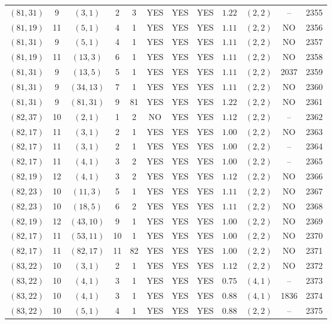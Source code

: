 \begin{longtable}{|c|c|c|c|c|c|c|c|c|c|c|c|}
$(81,31)$ & 9 & $(3,1)$ & 2 & 3 & YES & YES & YES & $1.22$ & $(2,2)$ & -- & 2355\\
$(81,19)$ & 11 & $(5,1)$ & 4 & 1 & YES & YES & YES & $1.11$ & $(2,2)$ & NO & 2356\\
$(81,31)$ & 9 & $(5,1)$ & 4 & 1 & YES & YES & YES & $1.11$ & $(2,2)$ & NO & 2357\\
$(81,19)$ & 11 & $(13,3)$ & 6 & 1 & YES & YES & YES & $1.11$ & $(2,2)$ & NO & 2358\\
$(81,31)$ & 9 & $(13,5)$ & 5 & 1 & YES & YES & YES & $1.11$ & $(2,2)$ & 2037 & 2359\\
$(81,31)$ & 9 & $(34,13)$ & 7 & 1 & YES & YES & YES & $1.11$ & $(2,2)$ & NO & 2360\\
$(81,31)$ & 9 & $(81,31)$ & 9 & 81 & YES & YES & YES & $1.22$ & $(2,2)$ & NO & 2361\\
$(82,37)$ & 10 & $(2,1)$ & 1 & 2 & NO & YES & YES & $1.12$ & $(2,2)$ & -- & 2362\\
$(82,17)$ & 11 & $(3,1)$ & 2 & 1 & YES & YES & YES & $1.00$ & $(2,2)$ & NO & 2363\\
$(82,17)$ & 11 & $(3,1)$ & 2 & 1 & YES & YES & YES & $1.00$ & $(2,2)$ & -- & 2364\\
$(82,17)$ & 11 & $(4,1)$ & 3 & 2 & YES & YES & YES & $1.00$ & $(2,2)$ & -- & 2365\\
$(82,19)$ & 12 & $(4,1)$ & 3 & 2 & YES & YES & YES & $1.12$ & $(2,2)$ & NO & 2366\\
$(82,23)$ & 10 & $(11,3)$ & 5 & 1 & YES & YES & YES & $1.11$ & $(2,2)$ & NO & 2367\\
$(82,23)$ & 10 & $(18,5)$ & 6 & 2 & YES & YES & YES & $1.11$ & $(2,2)$ & NO & 2368\\
$(82,19)$ & 12 & $(43,10)$ & 9 & 1 & YES & YES & YES & $1.00$ & $(2,2)$ & NO & 2369\\
$(82,17)$ & 11 & $(53,11)$ & 10 & 1 & YES & YES & YES & $1.00$ & $(2,2)$ & NO & 2370\\
$(82,17)$ & 11 & $(82,17)$ & 11 & 82 & YES & YES & YES & $1.00$ & $(2,2)$ & NO & 2371\\
$(83,22)$ & 10 & $(3,1)$ & 2 & 1 & YES & YES & YES & $1.12$ & $(2,2)$ & NO & 2372\\
$(83,22)$ & 10 & $(4,1)$ & 3 & 1 & YES & YES & YES & $0.75$ & $(4,1)$ & -- & 2373\\
$(83,22)$ & 10 & $(4,1)$ & 3 & 1 & YES & YES & YES & $0.88$ & $(4,1)$ & 1836 & 2374\\
$(83,22)$ & 10 & $(5,1)$ & 4 & 1 & YES & YES & YES & $0.88$ & $(2,2)$ & -- & 2375\\

\end{longtable}
